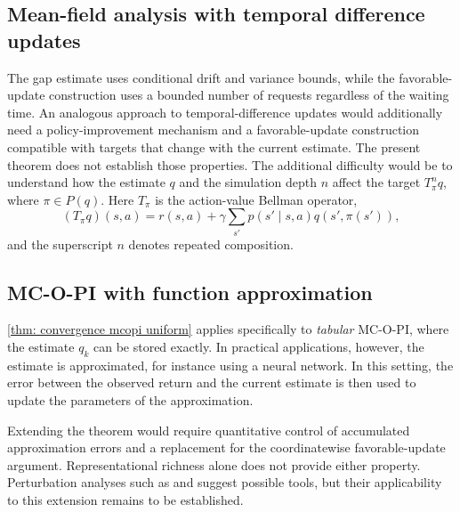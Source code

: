 \subsection{Mean-field analysis with temporal difference updates}
\label{sec: discussion temporal difference}

The gap estimate uses conditional drift and variance bounds, while the favorable-update construction uses a bounded number of requests regardless of the waiting time. An analogous approach to temporal-difference updates would additionally need a policy-improvement mechanism and a favorable-update construction compatible with targets that change with the current estimate. The present theorem does not establish those properties.
The additional difficulty would be to understand how the estimate $q$ and the simulation depth $n$ affect the target $T_{\pi}^n q$, where $\pi \in P(q)$. Here $T_\pi$ is the action-value Bellman operator,
\[
(T_\pi q)(s,a)=r(s,a)+\gamma\sum_{s'}p(s'\mid s,a)q(s',\pi(s')),
\]
and the superscript $n$ denotes repeated composition.


\subsection{MC-O-PI with function approximation}
\label{sec: discussion function approximation}

\autoref{thm: convergence mcopi uniform} applies specifically to \textit{tabular} MC-O-PI, where the estimate $q_k$ can be stored exactly.
In practical applications, however, the estimate is approximated, for instance using a neural network.
In this setting, the error between the observed return and the current estimate is then used to update the parameters of the approximation.

Extending the theorem would require quantitative control of accumulated approximation errors and a replacement for the coordinatewise favorable-update argument. Representational richness alone does not provide either property. Perturbation analyses such as \citet[Section~4.3.3]{Bertsekas1996Neuro-DynamicProgramming} and \citet[Section~5.2]{Kushner2003StochasticApplications} suggest possible tools, but their applicability to this extension remains to be established.

